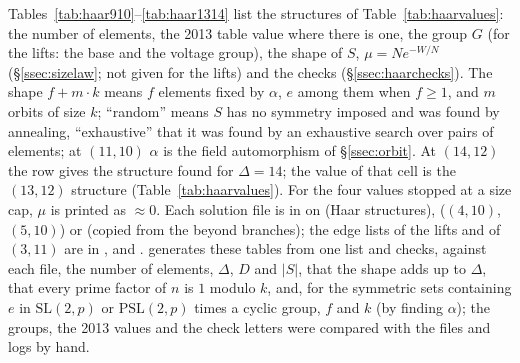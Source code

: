 \documentclass[11pt]{amsart}
\theoremstyle{definition}
\theoremstyle{remark}
\begin{document}
Tables~\ref{tab:haar910}--\ref{tab:haar1314} list the structures of Table~\ref{tab:haarvalues}: the number of elements, the 2013 table value where there is one, the group $G$ (for the lifts: the base and the voltage group), the shape of $S$, $\mu=Ne^{-W/N}$ (\S\ref{ssec:sizelaw}; not given for the lifts) and the checks (\S\ref{ssec:haarchecks}). The shape $f+m\cdot k$ means $f$ elements fixed by $\alpha$, $e$ among them when $f\ge1$, and $m$ orbits of size $k$; ``random'' means $S$ has no symmetry imposed and was found by annealing, ``exhaustive'' that it was found by an exhaustive search over pairs of elements; at $(11,10)$ $\alpha$ is the field automorphism of \S\ref{ssec:orbit}. At $(14,12)$ the row gives the structure found for $\Delta=14$; the value of that cell is the $(13,12)$ structure (Table~\ref{tab:haarvalues}). For the four values stopped at a size cap, $\mu$ is printed as $\approx0$. Each solution file is in  on  (Haar structures),  ($(4,10)$, $(5,10)$) or  (copied from the beyond branches); the edge lists of the lifts and of $(3,11)$ are in ,  and .  generates these tables from one list and checks, against each file, the number of elements, $\Delta$, $D$ and $|S|$, that the shape adds up to $\Delta$, that every prime factor of $n$ is $1$ modulo $k$, and, for the symmetric sets containing $e$ in $\mathrm{SL}(2,p)$ or $\mathrm{PSL}(2,p)$ times a cyclic group, $f$ and $k$ (by finding $\alpha$); the groups, the 2013 values and the check letters were compared with the files and logs by hand.
\end{document}
